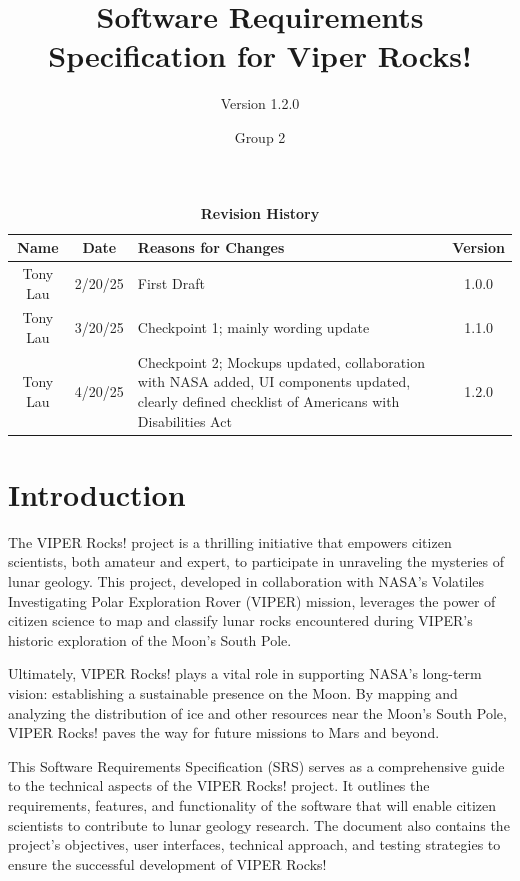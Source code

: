 \documentclass{article}
\begin{document}
\title{Software Requirements Specification for Viper Rocks!}
\author{Version 1.2.0}
\date{Group 2}

\maketitle
\tableofcontents
\newpage

\fancyhf{}
\fancyfoot[C]{\thepage}

\begin{table}[h!]
\centering
\caption{\textbf{Revision History}}
\begin{tabularx}{\textwidth}{|c|c|X|c|}
\hline
\textbf{Name} & \textbf{Date} & \textbf{Reasons for Changes} & \textbf{Version} \\
\hline
Tony Lau & 2/20/25 & First Draft & 1.0.0 \\
\hline
Tony Lau & 3/20/25 & Checkpoint 1; mainly wording update & 1.1.0 \\
\hline
Tony Lau & 4/20/25 & Checkpoint 2; Mockups updated, collaboration with NASA added, UI components updated, clearly defined checklist of Americans with Disabilities Act & 1.2.0 \\
\hline

\hline
\end{tabularx}
\end{table}

\section{Introduction}
The VIPER Rocks! project is a thrilling initiative that empowers citizen scientists, both amateur and expert, to participate in unraveling the mysteries of lunar geology. This project, developed in collaboration with NASA's Volatiles Investigating Polar Exploration Rover (VIPER) mission, leverages the power of citizen science to map and classify lunar rocks encountered during VIPER's historic exploration of the Moon's South Pole.

Ultimately, VIPER Rocks! plays a vital role in supporting NASA's long-term vision: establishing a sustainable presence on the Moon. By mapping and analyzing the distribution of ice and other resources near the Moon's South Pole, VIPER Rocks! paves the way for future missions to Mars and beyond.

This Software Requirements Specification (SRS) serves as a comprehensive guide to the technical aspects of the VIPER Rocks! project. It outlines the requirements, features, and functionality of the software that will enable citizen scientists to contribute to lunar geology research. The document also contains the project's objectives, user interfaces, technical approach, and testing strategies to ensure the successful development of VIPER Rocks!
\end{document}
